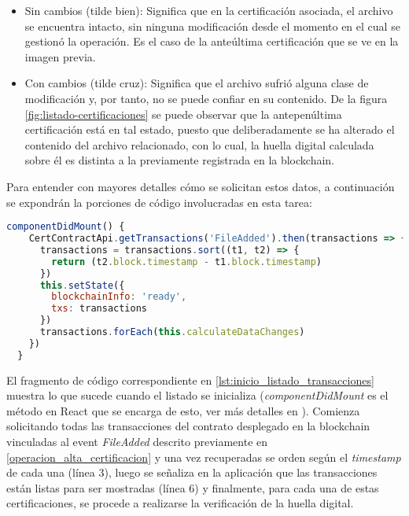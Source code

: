 \begin{itemize}
\begin{itemize}
    \item Sin cambios (tilde bien): Significa que en la certificación asociada, el archivo se encuentra intacto, sin ninguna modificación desde el momento en el cual se gestionó la operación. Es el caso de la anteúltima certificación que se ve en la imagen previa.
    \item Con cambios (tilde cruz): Significa que el archivo sufrió alguna clase de modificación y, por tanto, no se puede confiar en su contenido. De la figura \ref{fig:listado-certificaciones} se puede observar que la antepenúltima certificación está en tal estado, puesto que deliberadamente se ha alterado el contenido del archivo relacionado, con lo cual, la huella digital calculada sobre él es distinta a la previamente registrada en la blockchain.
  \end{itemize}
\end{itemize}

Para entender con mayores detalles cómo se solicitan estos datos, a continuación se expondrán la porciones de código involucradas en esta tarea:

\begin{minipage}{\linewidth}
\begin{lstlisting}[frame=single, belowskip=1em, aboveskip=2em,  language=javascript, captionpos=b, caption=Inicialización del listado de transacciones, label={lst:inicio_listado_transacciones}]
  componentDidMount() {
    CertContractApi.getTransactions('FileAdded').then(transactions => {
      transactions = transactions.sort((t1, t2) => {
        return (t2.block.timestamp - t1.block.timestamp)
      })
      this.setState({
        blockchainInfo: 'ready',
        txs: transactions
      })
      transactions.forEach(this.calculateDataChanges)
    })
  }
\end{lstlisting}
\end{minipage}

El fragmento de código correspondiente en \ref{lst:inicio_listado_transacciones} muestra lo que sucede cuando el listado se inicializa (\textit{componentDidMount} es el método en React que se encarga de esto, ver más detalles en \cite{React2018}). Comienza solicitando todas las transacciones del contrato desplegado en la blockchain vinculadas al event \textit{FileAdded} descrito previamente en \ref{operacion_alta_certificacion} y una vez recuperadas se orden según el \textit{timestamp} de cada una (línea 3), luego se señaliza en la aplicación que las transacciones están listas para ser mostradas (línea 6) y finalmente, para cada una de estas certificaciones, se procede a realizarse la verificación de la huella digital.

